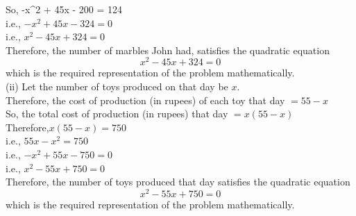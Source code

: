 \documentclass[12pt]{article}
\begin{document}
\hspace{-5em} 
So, \quad -x^2 + 45x - 200 = 124
\hspace{6em} {}\\
\hspace*{-22em} i.e., \quad $-x^2 + 45x - 324 = 0$\\
\hspace*{-23em} i.e., \quad $x^2 - 45x + 324 = 0$\\
\hspace{-4em}
Therefore, the number of marbles John had, satisfies the quadratic equation
\[
{x^2 - 45x + 324 = 0}
\]
\hspace{-7em}
which is the required representation of the problem mathematically.\\
\vspace{0.4em}
\hspace{-13em}
(ii) Let the number of toys produced on that day be $x$.\\
\vspace{0.4em}
\hspace*{-4em} Therefore, the cost of production (in rupees) of each toy that day $= 55 - x$\\
\vspace{0.4em}
\hspace*{-8em} So, the total cost of production (in rupees) that day $= x(55 - x)$\\
\vspace{0.4em}
\hspace*{-16em} Therefore,\hspace{6em}\quad $x(55 - x) = 750$\\
\vspace{0.4em}
\hspace*{-16em} i.e.,\hspace{8em} \quad $55x - x^2 = 750$\\
\vspace{0.4em}
\hspace*{-17em} i.e.,\hspace{5em} \quad $-x^2 + 55x - 750 = 0$\\
\vspace{0.4em}
\hspace*{-17em} i.e.,\hspace{6em} \quad $x^2 - 55x + 750 = 0$\\
\vspace{0.4em}
\hspace*{-2em}Therefore, the number of toys produced that day satisfies the quadratic equation
\[
x^2 - 55x + 750 = 0
\]
\hspace{-6em}
which is the required representation of the problem mathematically.
\end{document}
